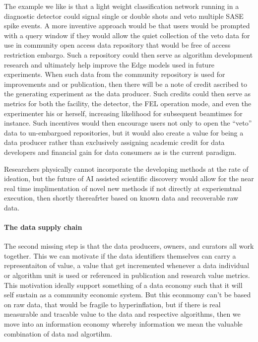 \documentclass{article}
\begin{document}
The example we like is that a light weight classification network running in a diagnostic detector could signal single or double shots and veto multiple SASE spike events.
A more inventive approach would be that users would be prompted with a query window if they would allow the quiet collection of the veto data for use in community open access data repository that would be free of access restriction embargo.
Such a repository could then serve as algorithm development research and ultimately help improve the Edge models used in future experiments.
When such data from the community repository is used for improvements and or publication, then there will be a note of credit ascribed to the generating experiment as the data producer.
Such credits could then serve as metrics for both the facility, the detector, the FEL operation mode, and even the experimenter his or herself, increasing likelihood for subsequent beamtimes for instance.
Such incentives would then encourage users not only to open the ``veto'' data to un-embargoed repositories, but it would also create a value for being a data producer rather than exclusively assigning academic credit for data developers and financial gain for data consumers as is the current paradigm.

Researchers physically cannot incorporate the developing methods at the rate of ideation, but the future of AI assisted scientific discovery would allow for the near real time implimentation of novel new methods if not directly at experiemtnal execution, then shortly thereafrter based on known data and recoverable raw data.

\paragraph{The data supply chain}
The second missing step is that the data producers, owners, and curators all work together.  This we can motivate if the data identifiers themselves can carry a representaiton of value, a value that get incremented whenever a data individual or algorithm unit is used or referenced in publication and research value metrics.
This motivation ideally support something of a data economy such that it will self sustain as a community economic system.  But this econmomy can't be based on raw data, that would be fragile to hyperinflation, but if there is real measurable and tracable value to the data and respective algorithms, then we move into an information economy whereby information we mean the valuable combination of data nad algortihm.
\end{document}
